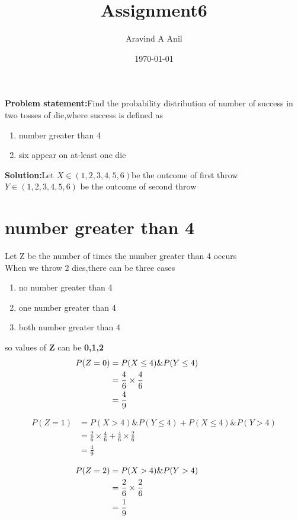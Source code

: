 \documentclass[11pt,a4paper,twocolumn]{article}
\title{Assignment6}
\author{Aravind A Anil}
\date{\today}
\begin{document}
\maketitle
\begin{flushleft}
\textbf{Problem statement:}Find the probability distribution of number of success in two tosses of die,where success is defined as
\begin{enumerate}[i]
    \item number greater than 4
    \item six appear on at-least one die
\end{enumerate}
\textbf{Solution:}Let $X\in(1,2,3,4,5,6)$be the outcome of first throw\\
$Y\in(1,2,3,4,5,6)$ be the outcome of second throw
\section{number greater than 4}
Let Z be the number of times the number greater than 4 occurs\\
When we throw 2 dies,there can be three cases
\begin{enumerate}
    \item no number greater than 4
    \item one number greater than 4
    \item both number greater than 4
\end{enumerate}
so values of \textbf{Z} can be \textbf{0,1,2}\\
\begin{align*}
\hspace{-3cm}
P(Z=0)&=P(X\leq4)\&P(Y\leq4)\\
&=\frac{4}{6}\times\frac{4}{6}\\
&=\frac{4}{9}
\end{align*}

\begin{align*}
    P(Z=1)&=P(X>4)\&P(Y\leq4)+P(X\leq4)\&P(Y>4)\\
    &=\frac{2}{6}\times\frac{4}{6}+\frac{4}{6}\times\frac{2}{6}\\
    &=\frac{4}{9}
\end{align*}
\end{flushleft}
\begin{align*}
\hspace{-5cm}
    P(Z=2)&=P(X>4)\&P(Y>4)\\
    &=\frac{2}{6}\times\frac{2}{6}\\
    &=\frac{1}{9}
\end{align*}
\end{document}
